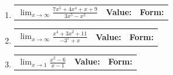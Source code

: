 \documentclass[11pt]{article}
\begin{document}
\begin{enumerate}
\begin{enumerate}
    \vfill

    \item 
    \begin{tabularx}{\textwidth}{lX X}
        $\displaystyle \lim_{x\to \infty} \frac{7x^5 + 4x^4+x+9}{3x^5 - x^2}$ & 
        \textbf{Value:} \hrulefill & 
        \textbf{Form:} \hrulefill
    \end{tabularx}
    
    \vfill

    \item 
    \begin{tabularx}{\textwidth}{lX X}
        $\displaystyle \lim_{x\to \infty} \frac{x^4+3x^2+11}{-3^x + x}$ & 
        \textbf{Value:} \hrulefill & 
        \textbf{Form:} \hrulefill
    \end{tabularx}
    
    \vfill

    \item 
    \begin{tabularx}{\textwidth}{lX X}
        $\displaystyle \lim_{x\to 1} \frac{x^2 - 6}{x-1}$ & 
        \textbf{Value:} \hrulefill & 
        \textbf{Form:} \hrulefill
    \end{tabularx}

    \vfill
\end{enumerate}




\newpage


\end{enumerate}
\end{document}
